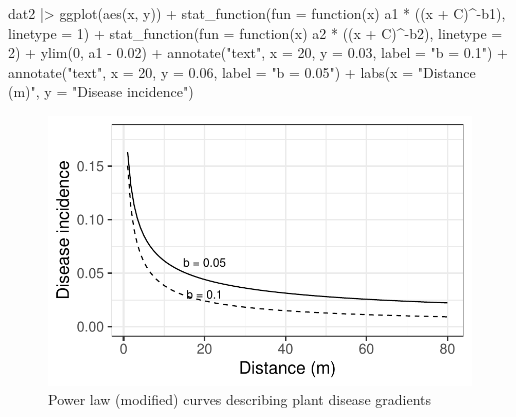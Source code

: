 \documentclass[
  letterpaper,
  DIV=11,
  numbers=noendperiod]{scrreprt}
\newenvironment{Shaded}{\begin{snugshade}}{\end{snugshade}}
\newcommand{\AttributeTok}[1]{\textcolor[rgb]{0.40,0.45,0.13}{#1}}
\newcommand{\ControlFlowTok}[1]{\textcolor[rgb]{0.00,0.23,0.31}{#1}}
\newcommand{\DecValTok}[1]{\textcolor[rgb]{0.68,0.00,0.00}{#1}}
\newcommand{\FloatTok}[1]{\textcolor[rgb]{0.68,0.00,0.00}{#1}}
\newcommand{\FunctionTok}[1]{\textcolor[rgb]{0.28,0.35,0.67}{#1}}
\newcommand{\NormalTok}[1]{\textcolor[rgb]{0.00,0.23,0.31}{#1}}
\newcommand{\SpecialCharTok}[1]{\textcolor[rgb]{0.37,0.37,0.37}{#1}}
\newcommand{\StringTok}[1]{\textcolor[rgb]{0.13,0.47,0.30}{#1}}
\begin{document}
\begin{Shaded}
\begin{Highlighting}[]
\NormalTok{dat2 }\SpecialCharTok{|\textgreater{}}
  \FunctionTok{ggplot}\NormalTok{(}\FunctionTok{aes}\NormalTok{(x, y)) }\SpecialCharTok{+}
  \FunctionTok{stat\_function}\NormalTok{(}\AttributeTok{fun =} \ControlFlowTok{function}\NormalTok{(x) a1 }\SpecialCharTok{*}\NormalTok{ ((x }\SpecialCharTok{+}\NormalTok{ C)}\SpecialCharTok{\^{}{-}}\NormalTok{b1), }\AttributeTok{linetype =} \DecValTok{1}\NormalTok{) }\SpecialCharTok{+}
  \FunctionTok{stat\_function}\NormalTok{(}\AttributeTok{fun =} \ControlFlowTok{function}\NormalTok{(x) a2 }\SpecialCharTok{*}\NormalTok{ ((x }\SpecialCharTok{+}\NormalTok{ C)}\SpecialCharTok{\^{}{-}}\NormalTok{b2), }\AttributeTok{linetype =} \DecValTok{2}\NormalTok{) }\SpecialCharTok{+}
  \FunctionTok{ylim}\NormalTok{(}\DecValTok{0}\NormalTok{, a1 }\SpecialCharTok{{-}} \FloatTok{0.02}\NormalTok{) }\SpecialCharTok{+}
  \FunctionTok{annotate}\NormalTok{(}\StringTok{"text"}\NormalTok{, }\AttributeTok{x =} \DecValTok{20}\NormalTok{, }\AttributeTok{y =} \FloatTok{0.03}\NormalTok{, }\AttributeTok{label =} \StringTok{"b = 0.1"}\NormalTok{) }\SpecialCharTok{+}
  \FunctionTok{annotate}\NormalTok{(}\StringTok{"text"}\NormalTok{, }\AttributeTok{x =} \DecValTok{20}\NormalTok{, }\AttributeTok{y =} \FloatTok{0.06}\NormalTok{, }\AttributeTok{label =} \StringTok{"b = 0.05"}\NormalTok{) }\SpecialCharTok{+}
  \FunctionTok{labs}\NormalTok{(}\AttributeTok{x =} \StringTok{"Distance (m)"}\NormalTok{, }\AttributeTok{y =} \StringTok{"Disease incidence"}\NormalTok{)}
\end{Highlighting}
\end{Shaded}

\begin{figure}[H]

{\centering \includegraphics{spatial-models_files/figure-pdf/fig-power1-1.pdf}

}

\caption{\label{fig-power1}Power law (modified) curves describing plant
disease gradients}

\end{figure}
\end{document}
